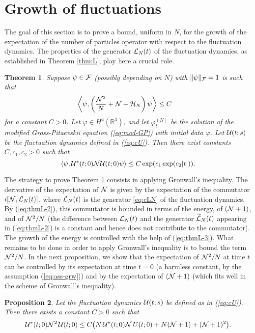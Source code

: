 \documentclass[11pt,a4paper]{article}
\newtheorem{thm}{Theorem}[section]  %
\newtheorem{proposition}[thm]{Proposition}
\newcommand{\cU}{{\cal U}}
\newcommand{\bR}{{\mathbb R}}
\newcommand{\wt}{\widetilde}
\newcommand{\cF}{{\cal F}}
\newcommand{\cH}{{\cal H}}
\newcommand{\cL}{{\cal L}}
\newcommand{\cN}{{\cal N}}
\newcommand{\N}{\mathcal{N}}
\begin{document}
\section{Growth of fluctuations}
\label{s:growthoffluct}
The goal of this section is to prove a bound, uniform in $N$, for the growth of the expectation of the number of particles operator with respect to the fluctuation dynamics. The properties of the generator $\cL_N (t)$ of the fluctuation dynamics, as established in Theorem \ref{thm:L}, play here a crucial role.

\begin{thm}\label{thm:N}
Suppose $\psi \in \cF$ (possibly depending on $N$) with $\| \psi \|_\cF  =1$ is such that \begin{equation}\label{eq:ass-grw} \begin{split} \left\langle \psi , \left( \frac{\cN^2}{N} + \cN + \cH_N \right) \psi \right\rangle &\leq C  \end{split} \end{equation}
for a constant $C>0$. Let $\varphi \in H^4 (\bR^3)$, and let $\varphi_t^{(N)}$ be the solution of the modified Gross-Pitaevskii equation (\ref{eq:mod-GP}) with initial data $\varphi$. Let $\cU (t;s)$ be the fluctuation dynamics defined in (\ref{eq:cU}). Then there exist constants $C,c_1,c_2 > 0$ such that
\[ \langle \psi , \cU^* (t;0) \cN \cU (t;0) \psi \rangle \leq C \exp (c_1 \exp (c_2 |t|)). \] 
\end{thm}

The strategy to prove Theorem \ref{thm:N} consists in applying Gronwall's
inequality. The derivative of the expectation of $\cN$ is given by the
expectation of the commutator $i[\cN , \cL_N (t)]$, where $\cL_N(t)$ is the
generator \eqref{eq:cLN} of the fluctuation dynamics. By (\ref{eq:thmL-2}),
this commutator  is bounded in terms of the energy, of $(\cN+ 1)$, and of
$\cN^2/N$ (the difference between $\cL_N (t)$ and the generator $\wt{\cL}_N
(t)$ appearing in (\ref{eq:thmL-2}) is a constant and hence does not
contribute to the commutator). The growth of the energy is controlled with
the help of (\ref{eq:thmL-3}). What remains to be done in order to apply
Gronwall's inequality is to bound the term $\cN^2 / N$. In the next
proposition, we show that the expectation of $\cN^2/N$ at time $t$ can be
controlled by its expectation at time $t=0$ (a harmless constant, by the
assumption (\ref{eq:ass-grw})) and by the expectation of $(\cN+1)$ (which
fits well in the scheme of Gronwall's inequality). 

\begin{proposition} \label{prop:apri}
Let the fluctuation dynamics $\cU (t;s)$ be defined as in (\ref{eq:cU}). Then there exists a constant $C > 0$ such that
 \[ \cU^* (t;0) \N^2 \, \cU (t;0) \le C \big( N  \, \cU^* (t;0) \N \, U (t;0) + N (\N+1) + (\N+1)^2 \big).
 \]
\end{proposition}
\end{document}
